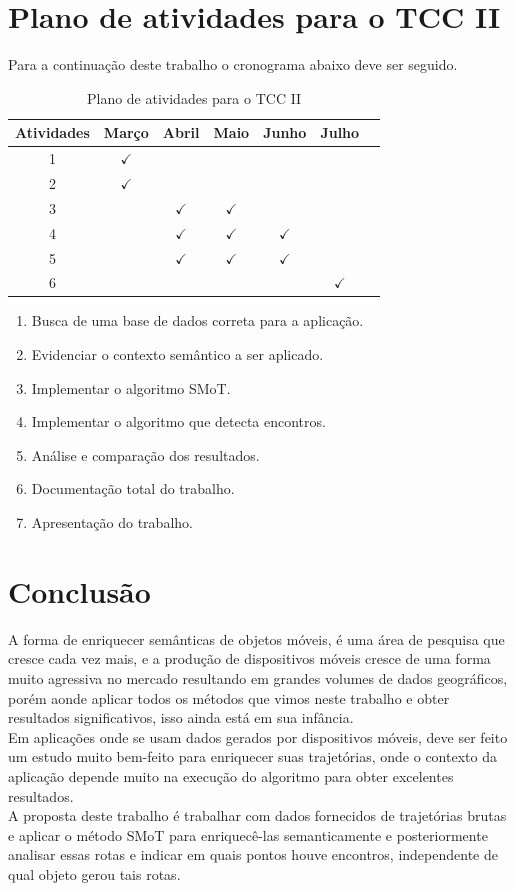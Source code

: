 \documentclass[	12pt, Times, openright, twoside, a4paper, english, brazil]{abntex2}
\begin{document}
\chapter{Plano de atividades para o TCC II}
Para a continuação deste trabalho o cronograma abaixo deve ser seguido.

\begin{table}[!ht]
	\centering
		\caption{Plano de atividades para o TCC II}	\label{tab:plano}
		\begin{tabular}{|c|c|c|c|c|c|c|}
			\hline  \textbf{Atividades} &	\textbf{Março} &	\textbf{Abril} & \textbf{Maio} & \textbf{Junho} & \textbf{Julho} \\
			\hline 1 & $\checkmark$ 	& & & & 	\\
			\hline 2 & $\checkmark$	& & & & 	\\
			\hline 3 & 	&$\checkmark$ &$\checkmark$ & & 	\\
			\hline 4 & 	&$\checkmark$ &$\checkmark$ &$\checkmark$ & 	\\
			\hline 5 & 	&$\checkmark$ &$\checkmark$ &$\checkmark$ & 	\\
            \hline 6 &  & & & &$\checkmark$ 	\\
			\hline 
		\end{tabular}
\end{table}
\begin{enumerate}
\item Busca de uma base de dados correta para a aplicação.
\item Evidenciar o contexto semântico a ser aplicado.
\item Implementar o algoritmo SMoT.
\item Implementar o algoritmo que detecta encontros.
\item Análise e comparação dos resultados.
\item Documentação total do trabalho.
\item Apresentação do trabalho.
\end{enumerate}

\chapter{Conclusão}
A forma de enriquecer semânticas de objetos móveis, é uma área de pesquisa que cresce cada vez mais, e a produção de dispositivos móveis cresce de uma forma muito agressiva no mercado resultando em grandes volumes de dados geográficos, porém aonde aplicar todos os métodos que vimos neste trabalho e obter resultados significativos, isso ainda está em sua infância. \\
\indent	Em aplicações onde se usam dados gerados por dispositivos móveis, deve ser feito um estudo muito bem-feito para enriquecer suas trajetórias, onde o contexto da aplicação depende muito na execução do algoritmo para obter excelentes resultados.\\
\indent	A proposta deste trabalho é trabalhar com dados fornecidos de trajetórias brutas e aplicar o método SMoT para enriquecê-las semanticamente e posteriormente analisar essas rotas e indicar em quais pontos houve encontros, independente de qual objeto gerou tais rotas.
\end{document}
